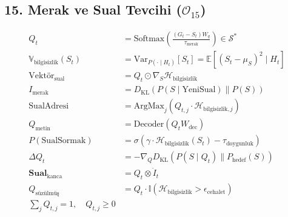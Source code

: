 \documentclass[11pt, a4paper]{article}
\begin{document}
\subsection{15. Merak ve Sual Tevcihi ($\mathcal{O}_{15}$)}
\begin{align}
Q_t &= \text{Softmax}\left( \frac{(G_t - S_t) W_q}{\tau_{\text{merak}}} \right) \in \mathcal{S}^* \\
\mathbb{V}_{\text{bilgisizlik}}(S_t) &= \text{Var}_{P(\cdot \mid H_t)}[S_t] = \mathbb{E}[(S_t - \mu_S)^2 \mid H_t] \\
\text{Vektör}_{\text{sual}} &= Q_t \odot \nabla_{S} \mathcal{H}_{\text{bilgisizlik}} \\
I_{\text{merak}} &= D_{\text{KL}}\left( P(S \mid \text{YeniSual}) \parallel P(S) \right) \\
\text{SualAdresi} &= \text{ArgMax}_{j} (Q_{t, j} \cdot \mathcal{H}_{\text{bilgisizlik}, j}) \\
Q_{\text{metin}} &= \text{Decoder}(Q_t W_{\text{dec}}) \\
P(\text{SualSormak}) &= \sigma(\gamma \cdot \mathcal{H}_{\text{bilgisizlik}}(S_t) - \tau_{\text{doygunluk}}) \\
\Delta Q_t &= -\nabla_Q D_{\text{KL}}(P(S \mid Q_t) \parallel P_{\text{hedef}}(S)) \\
\mathbf{Sual}_{\text{kanca}} &= Q_t \otimes \dot{I}_t \\
Q_{\text{süzülmüş}} &= Q_t \cdot \mathbb{I}(\mathcal{H}_{\text{bilgisizlik}} > \epsilon_{\text{cehalet}}) \\
\sum_j Q_{t,j} = 1, \quad Q_{t,j} \ge 0
\end{align}
\end{document}
